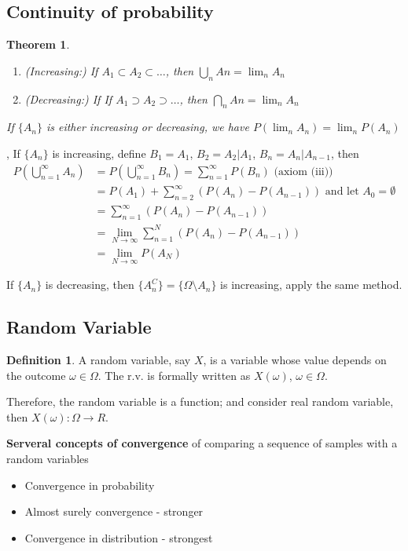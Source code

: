 \documentclass[11pt]{article}
\newtheorem{theorem}{Theorem}[section]
\theoremstyle{definition}
\newtheorem{definition}{Definition}[section]
\theoremstyle{remark}
\begin{document}
\subsection{Continuity of probability}
    \begin{theorem}
        \begin{enumerate}
            \item (Increasing:) If $A_1 \subset A_2 \subset \dots$, then $\bigcup_n An = \lim_n A_n$
            \item (Decreasing:) If If $A_1 \supset A_2 \supset \dots$, then $\bigcap_n An = \lim_n A_n$
        \end{enumerate}
        If $\{A_n\}$ is either increasing or decreasing, we have $P(\lim_n A_n) = \lim_n P(A_n)$
    \end{theorem}
    \proofname, 
    If $\{A_n\}$ is increasing, define $B_1=A_1$, $B_2=A_2|A_1$, $B_n=A_n|A_{n-1}$, then
    \begin{align*}
        P(\bigcup_{n=1}^\infty A_n) &= P(\bigcup_{n=1}^\infty B_n) = \sum_{n=1}^\infty P( B_n) \text{ (axiom (iii))}\\
        &= P(A_1) + \sum_{n=2}^\infty (P(A_n) - P(A_{n-1})) \text{ and let $A_0 = \emptyset$} \\
        &= \sum_{n=1}^\infty (P(A_n) - P(A_{n-1})) \\
        &= \lim_{N\to\infty}  \sum_{n=1}^N (P(A_n) - P(A_{n-1})) \\
        &= \lim_{N\to\infty} P(A_N)
    \end{align*}
    
    If $\{A_n\}$ is decreasing, then $\{A_n^C\} =  \{\Omega \setminus A_n\}$ is increasing, apply the same method.

\subsection{Random Variable}
    \begin{definition}
        A random variable, say $X$, is a variable whose value depends on the outcome $\omega \in \Omega$. The r.v. is formally written as $X(\omega)$, $\omega \in \Omega$. 
    
        Therefore, the random variable is a function; and consider real random variable, then $X(\omega): \Omega \rightarrow R$.
    \end{definition}
    \textbf{Serveral concepts of convergence} of comparing a sequence of samples with a random variables 
    \begin{itemize}
        \item Convergence in probability
        \item Almost surely convergence - stronger
        \item Convergence in distribution - strongest
    \end{itemize}
    
\end{document}
